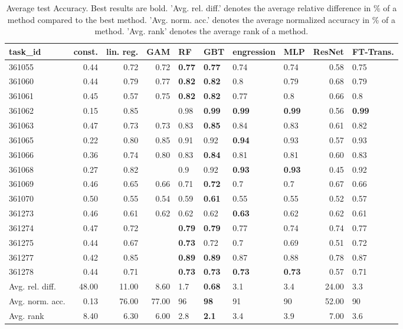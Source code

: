 \begin{table}[ht!]
\centering
\begingroup\footnotesize
\begin{tabular}{lrrrllllrl}
  \hline
\hline
task\_id & const. & lin. reg. & GAM & RF & GBT & engression & MLP & ResNet & FT-Trans. \\ 
  \hline
361055 & 0.44 & 0.72 & 0.72 & \textbf{0.77} & \textbf{0.77} & 0.74 & 0.74 & 0.58 & 0.75 \\ 
  361060 & 0.44 & 0.79 & 0.77 & \textbf{0.82} & \textbf{0.82} & 0.8 & 0.79 & 0.68 & 0.79 \\ 
  361061 & 0.45 & 0.57 & 0.75 & \textbf{0.82} & \textbf{0.82} & 0.77 & 0.8 & 0.66 & 0.8 \\ 
  361062 & 0.15 & 0.85 &  & 0.98 & \textbf{0.99} & \textbf{0.99} & \textbf{0.99} & 0.56 & \textbf{0.99} \\ 
  361063 & 0.47 & 0.73 & 0.73 & 0.83 & \textbf{0.85} & 0.84 & 0.83 & 0.61 & 0.82 \\ 
  361065 & 0.22 & 0.80 & 0.85 & 0.91 & 0.92 & \textbf{0.94} & 0.93 & 0.57 & 0.93 \\ 
  361066 & 0.36 & 0.74 & 0.80 & 0.83 & \textbf{0.84} & 0.81 & 0.81 & 0.60 & 0.83 \\ 
  361068 & 0.27 & 0.82 &  & 0.9 & 0.92 & \textbf{0.93} & \textbf{0.93} & 0.45 & 0.92 \\ 
  361069 & 0.46 & 0.65 & 0.66 & 0.71 & \textbf{0.72} & 0.7 & 0.7 & 0.67 & 0.66 \\ 
  361070 & 0.50 & 0.55 & 0.54 & 0.59 & \textbf{0.61} & 0.55 & 0.55 & 0.52 & 0.57 \\ 
  361273 & 0.46 & 0.61 & 0.62 & 0.62 & 0.62 & \textbf{0.63} & 0.62 & 0.62 & 0.61 \\ 
  361274 & 0.47 & 0.72 &  & \textbf{0.79} & \textbf{0.79} & 0.77 & 0.74 & 0.74 & 0.77 \\ 
  361275 & 0.44 & 0.67 &  & \textbf{0.73} & 0.72 & 0.7 & 0.69 & 0.51 & 0.72 \\ 
  361277 & 0.42 & 0.85 &  & \textbf{0.89} & \textbf{0.89} & 0.87 & 0.88 & 0.78 & 0.87 \\ 
  361278 & 0.44 & 0.71 &  & \textbf{0.73} & \textbf{0.73} & \textbf{0.73} & \textbf{0.73} & 0.57 & 0.71 \\ 
   \hline
Avg. rel. diff. & 48.00 & 11.00 & 8.60 & 1.7 & \textbf{0.68} & 3.1 & 3.4 & 24.00 & 3.3 \\ 
  Avg. norm. acc. & 0.13 & 76.00 & 77.00 & 96 & \textbf{98} & 91 & 90 & 52.00 & 90 \\ 
  Avg. rank & 8.40 & 6.30 & 6.00 & 2.8 & \textbf{2.1} & 3.4 & 3.9 & 7.00 & 3.6 \\ 
   \hline
\hline
\end{tabular}
\endgroup
\caption{Average test Accuracy. 
                  Best results are bold. 
                  'Avg. rel. diff.' denotes the average relative difference in \% of a method compared to the best method.
                  'Avg. norm. acc.' denotes the average normalized accuracy in \% of a method.
                  'Avg. rank' denotes the average rank of a method.} 
\label{table_results_Accuracy}
\end{table}
